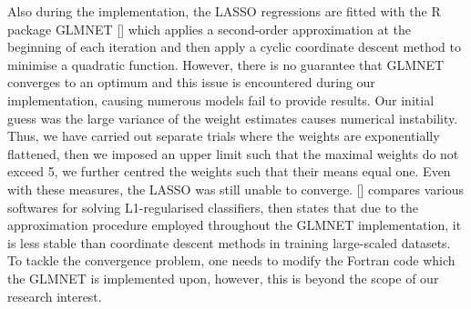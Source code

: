 \documentclass[a4paper,12pt]{article}
\begin{document}
Also during the implementation, the LASSO regressions are fitted with the R package GLMNET [\cite{friedman2009glmnet}] which applies a second-order approximation at the beginning of each iteration and then apply a cyclic coordinate descent method to minimise a quadratic function. However, there is no guarantee that GLMNET converges to an optimum and this issue is encountered during our implementation, causing numerous models fail to provide results. Our initial guess was the large variance of the weight estimates causes numerical instability. Thus, we have carried out separate trials where the weights are exponentially flattened, then we imposed an upper limit such that the maximal weights do not exceed 5, we further centred the weights such that their means equal one. Even with these measures, the LASSO was still unable to converge. [\cite{yuan2010comparison}] compares various softwares for solving L1-regularised classifiers, then states that due to the approximation procedure employed throughout the GLMNET implementation, it is less stable than coordinate descent methods in training large-scaled datasets. To tackle the convergence problem, one needs to modify the Fortran code which the GLMNET is implemented upon, however, this is beyond the scope of our research interest.
\end{document}
